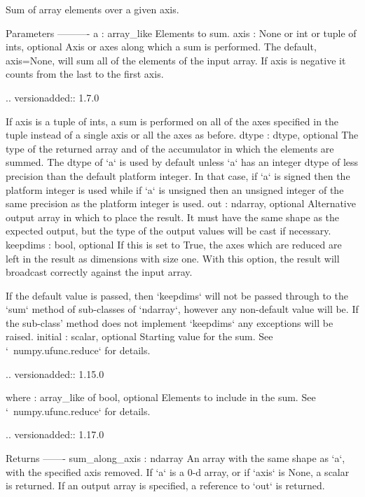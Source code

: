 \begin{DoxyVerb}Sum of array elements over a given axis.

Parameters
----------
a : array_like
    Elements to sum.
axis : None or int or tuple of ints, optional
    Axis or axes along which a sum is performed.  The default,
    axis=None, will sum all of the elements of the input array.  If
    axis is negative it counts from the last to the first axis.

    .. versionadded:: 1.7.0

    If axis is a tuple of ints, a sum is performed on all of the axes
    specified in the tuple instead of a single axis or all the axes as
    before.
dtype : dtype, optional
    The type of the returned array and of the accumulator in which the
    elements are summed.  The dtype of `a` is used by default unless `a`
    has an integer dtype of less precision than the default platform
    integer.  In that case, if `a` is signed then the platform integer
    is used while if `a` is unsigned then an unsigned integer of the
    same precision as the platform integer is used.
out : ndarray, optional
    Alternative output array in which to place the result. It must have
    the same shape as the expected output, but the type of the output
    values will be cast if necessary.
keepdims : bool, optional
    If this is set to True, the axes which are reduced are left
    in the result as dimensions with size one. With this option,
    the result will broadcast correctly against the input array.

    If the default value is passed, then `keepdims` will not be
    passed through to the `sum` method of sub-classes of
    `ndarray`, however any non-default value will be.  If the
    sub-class' method does not implement `keepdims` any
    exceptions will be raised.
initial : scalar, optional
    Starting value for the sum. See `~numpy.ufunc.reduce` for details.

    .. versionadded:: 1.15.0

where : array_like of bool, optional
    Elements to include in the sum. See `~numpy.ufunc.reduce` for details.

    .. versionadded:: 1.17.0

Returns
-------
sum_along_axis : ndarray
    An array with the same shape as `a`, with the specified
    axis removed.   If `a` is a 0-d array, or if `axis` is None, a scalar
    is returned.  If an output array is specified, a reference to
    `out` is returned.


\end{DoxyVerb}
